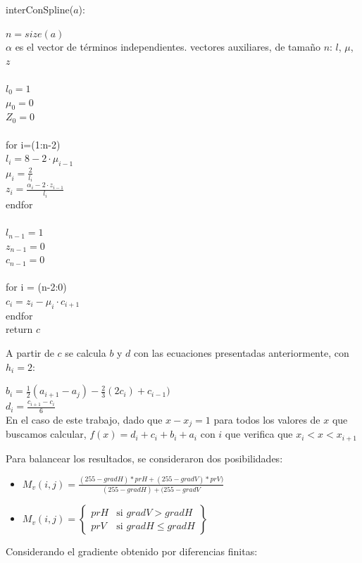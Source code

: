 \documentclass[a4paper]{article}
\begin{document}
\newcommand{\tab}{\hspace*{7mm}}
\begin{codesnippet}

interConSpline($a$):

\tab $n = size(a)$\\
\tab $\alpha$ es el vector de términos independientes.
\tab vectores auxiliares, de tamaño $n$: $l$, $\mu$, $z$\\
\\
\tab $l_0 = 1$ \\
\tab $\mu_0 = 0$ \\
\tab $Z_0 = 0$ \\
\\
\tab for i=(1:n-2)\\
\tab \tab $l_i = 8 - 2 \cdot \mu_{i-1}$ \\ %
\tab \tab $\mu_i = \frac{2}{l_i}$\\ %
\tab \tab $z_i = \frac{\alpha_i - 2 \cdot z_{i-1}}{l_i}$\\
\tab endfor\\
\\
\tab $l_{n-1} = 1$\\
\tab $z_{n-1} = 0$\\
\tab $c_{n-1} = 0$\\
\\
\tab for i = (n-2:0)\\
\tab \tab $c_i = z_i - \mu_i \cdot c_{i+1}$\\
\tab endfor \\
\tab return $c$
\end{codesnippet}

A partir de $c$ se calcula $b$ y $d$ con las ecuaciones presentadas anteriormente, con $h_i=2$:

$b_i = \frac{1}{2}(a_{i+1}-a_j)-\frac{2}{3}(2c_i)+c_{i-1})$\\

$d_i = \frac{c_{i+1} - c_i}{6}$ \\

En el caso de este trabajo, dado que $x-x_j=1$ para todos los valores de $x$ que buscamos calcular,
$f(x)=d_i+c_i+b_i+a_i$ con $i$ que verifica que $x_i<x<x_{i+1}$

Para balancear los resultados, se consideraron dos posibilidades:
\begin{itemize}
\item $M_v(i,j)=\frac{(255-gradH)*prH + (255-gradV)*prV)}{(255-gradH)+(255-gradV}$
\item $M_v(i,j)= \left \{\begin{array}{ll}
prH & \text{si } gradV>gradH \\ prV & \text{si } gradH \leq gradH\end{array} \right \} $

\end{itemize}
Considerando el gradiente obtenido por diferencias finitas:
\end{document}
